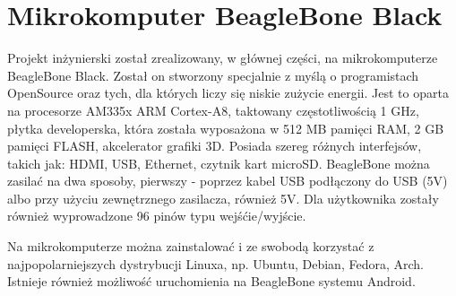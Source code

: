 \chapter{Mikrokomputer BeagleBone Black}
Projekt inżynierski został zrealizowany, w głównej części, na mikrokomputerze BeagleBone Black. Został on stworzony specjalnie z myślą o programistach OpenSource oraz tych, dla których liczy się niskie zużycie energii. Jest to oparta na procesorze AM335x ARM Cortex-A8, taktowany częstotliwością 1 GHz, płytka developerska, która została wyposażona w 512 MB pamięci RAM, 2 GB pamięci FLASH, akcelerator grafiki 3D. Posiada szereg różnych interfejsów, takich jak: HDMI, USB, Ethernet, czytnik kart microSD. BeagleBone można zasilać na dwa sposoby, pierwszy - poprzez kabel USB podłączony do USB (5V) albo przy użyciu zewnętrznego zasilacza, również 5V. Dla użytkownika zostały również wyprowadzone 96 pinów typu wejśćie/wyjście.

Na mikrokomputerze można zainstalować i ze swobodą korzystać z najpopolarniejszych dystrybucji Linuxa, np. Ubuntu, Debian, Fedora, Arch. Istnieje również możliwość uruchomienia na BeagleBone systemu Android.

